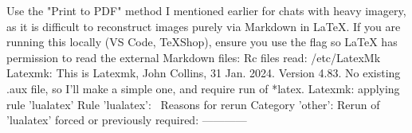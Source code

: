 \markdownRendererUlItem {} Use the "Print to PDF" method I mentioned earlier for chats with heavy imagery, as it is difficult to reconstruct images purely via Markdown in LaTeX.\markdownRendererUlItemEnd 
\markdownRendererUlEnd \markdownRendererOlItemEnd 
{} If you are running this locally (VS Code, TeXShop), ensure you use the  flag so LaTeX has permission to read the external Markdown files: \markdownRendererOlItemEnd 
\markdownRendererOlEnd \markdownRendererInterblockSeparator
{}\markdownRendererThematicBreak{}\markdownRendererInterblockSeparator
{}
\markdownRendererSectionEnd 
\markdownRendererSectionEnd \markdownRendererSectionBegin
{}\markdownRendererInterblockSeparator
{}Rc files read: /etc/LatexMk Latexmk: This is Latexmk, John Collins, 31 Jan. 2024. Version 4.83. No existing .aux file, so I'll make a simple one, and require run of *latex. Latexmk: applying rule 'lualatex'\markdownRendererEllipsis{} Rule 'lualatex':  Reasons for rerun Category 'other': Rerun of 'lualatex' forced or previously required:\markdownRendererInterblockSeparator
{}
\markdownRendererSectionEnd \markdownRendererSectionBegin
{}\markdownRendererInterblockSeparator
{}
\markdownRendererSectionEnd \markdownRendererSectionBegin
{}\markdownRendererInterblockSeparator
{}------------\markdownRendererInterblockSeparator
{}
\markdownRendererSectionEnd \markdownRendererSectionBegin
{}\markdownRendererInterblockSeparator
